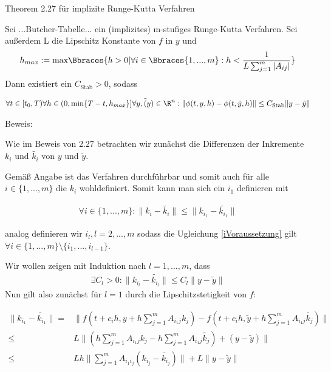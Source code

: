 \begin{solution}
Theorem 2.27 für implizite Runge-Kutta Verfahren

Sei ...Butcher-Tabelle... ein (implizites) m-stufiges Runge-Kutta Verfahren. Sei außerdem L die Lipschitz Konstante von $f$ in $y$ und
\begin{align*}
  h_{max} := \text{max}\Bbraces{h>0|\forall i \in \Bbraces{1,...,m}:h<\frac{1}{L\sum_{j=1}^{m}|A_{ij}|}}
\end{align*}
Dann existiert ein $C_{\text{Stab}} > 0$, sodass

\begin{align*}
  \forall t \in [t_{0},T) \forall h \in (0,\text{min}\{T-t,h_{max}\}] \forall y, \tilde(y) \in \R^{n} : \|\phi(t,y,h) - \phi(t,\tilde{y},h)\| \leq C_{\text{Stab}} \|y-\tilde{y}\|
\end{align*}

Beweis:

Wie im Beweis von 2.27 betrachten wir zunächst die Differenzen der Inkremente $k_{i}$ und $\tilde{k_{i}}$ von $y$ und $\tilde{y}$.

Gemäß Angabe ist das Verfahren durchführbar und somit auch für alle $i \in \{1,...,m\}$ die $k_{i}$ wohldefiniert.
Somit kann man sich ein $i_{1}$ definieren mit

\begin{align}\label{iVoraussetzung}
  \forall i\in \{1,...,m\}: \|k_{i}-\tilde{k_{i}}\| \leq \|k_{i_{1}}-\tilde{k_{i_{1}}}\|
\end{align}

analog definieren wir $i_{l}, l=2,...,m$ sodass die Ugleichung \eqref{iVoraussetzung} gilt $\forall i\in \{1,...,m\}\setminus \{i_{1},...,i_{l-1}\}$.

Wir wollen zeigen mit Induktion nach $l=1,...,m$, dass
\begin{align}\label{ind}
  \exists C_{l}>0: \|k_{i_{l}}-\tilde{k_{i_{l}}}\| \leq C_{l} \|y-\tilde{y}\|
\end{align}
Nun gilt also zunächst für $l=1$ durch die Lipschitzstetigkeit von $f$:

\begin{align*}
  \|k_{i_{1}}-\tilde{k_{i_{1}}}\| =& \|f(t+c_{i}h,y+h\sum_{j=1}^{m}A_{i_{1}j}k_{j})-f(t+c_{i}h,\tilde{y}+h\sum_{j=1}^{m}A_{i_{1}j}\tilde{k_{j}})\| \\
  \leq& L\|(h\sum_{j=1}^{m}A_{i_{1}j}k_{j}-h\sum_{j=1}^{m}A_{i_{1}j}\tilde{k_{j}}) + (y-\tilde{y})\| \\
  \leq& Lh \|\sum_{j=1}^{m}A_{i_{1}i_{j}}(k_{i_{j}}-\tilde{k_{i_{j}}})\| + L\|y-\tilde{y}\|
\end{align*}


\end{solution}
